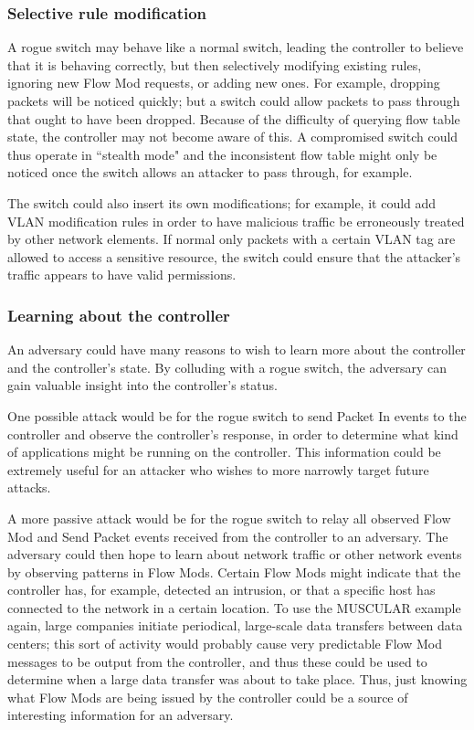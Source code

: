 \subsubsection{Selective rule modification}
A rogue switch may behave like a normal switch, leading the controller to believe that it is behaving correctly, but then selectively modifying existing rules, ignoring new Flow Mod requests, or adding new ones. For example, dropping packets will be noticed quickly; but a switch could allow packets to pass through that ought to have been dropped. Because of the difficulty of querying flow table state, the controller may not become aware of this. A compromised switch could thus operate in ``stealth mode" and the inconsistent flow table might only be noticed once the switch allows an attacker to pass through, for example.

The switch could also insert its own modifications; for example, it could add VLAN modification rules in order to have malicious traffic be erroneously treated by other network elements. If normal only packets with a certain VLAN tag are allowed to access a sensitive resource, the switch could ensure that the attacker's traffic appears to have valid permissions.

\subsubsection{Learning about the controller}
An adversary could have many reasons to wish to learn more about the controller and the controller's state. By colluding with a rogue switch, the adversary can gain valuable insight into the controller's status.

One possible attack would be for the rogue switch to send Packet In events to the controller and observe the controller's response, in order to determine what kind of applications might be running on the controller. This information could be extremely useful for an attacker who wishes to more narrowly target future attacks.

A more passive attack would be for the rogue switch to relay all observed Flow Mod and Send Packet events received from the controller to an adversary. The adversary could then hope to learn about network traffic or other network events by observing patterns in Flow Mods. Certain Flow Mods might indicate that the controller has, for example, detected an intrusion, or that a specific host has connected to the network in a certain location. To use the MUSCULAR example again, large companies initiate periodical, large-scale data transfers between data centers; this sort of activity would probably cause very predictable Flow Mod messages to be output from the controller, and thus these could be used to determine when a large data transfer was about to take place. Thus, just knowing what Flow Mods are being issued by the controller could be a source of interesting information for an adversary.

